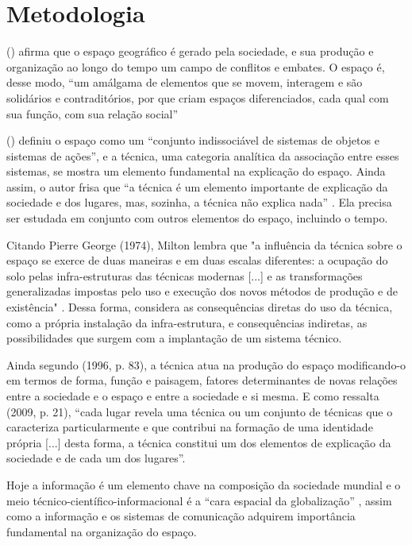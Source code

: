 \chapter{Metodologia}

 (\citeyear{isnard}) afirma que o espaço geográfico é gerado pela sociedade, e sua produção e organização ao longo do tempo um campo de conflitos e embates. O espaço é, desse modo, “um amálgama de elementos que se movem, interagem e são solidários e contraditórios, por que criam espaços diferenciados, cada qual com sua função, com sua relação social” \cite{mondardo}

 (\citeyear{santos1996}) definiu o espaço como um “conjunto indissociável de sistemas de objetos e sistemas de ações”, e a técnica, uma categoria analítica da associação entre esses sistemas, se mostra um elemento fundamental na explicação do espaço. Ainda assim, o autor frisa que “a técnica é um elemento importante de explicação da sociedade e dos lugares, mas, sozinha, a técnica não explica nada” \cite[p. 27]{santos1996}. Ela precisa ser estudada em conjunto com outros elementos do espaço, incluindo o tempo.

Citando Pierre George (1974), Milton lembra que "a influência da técnica sobre o espaço se exerce de duas maneiras e em duas escalas diferentes: a ocupação do solo pelas infra-estruturas das técnicas modernas [...] e as transformações generalizadas impostas pelo uso e execução dos novos métodos de produção e de existência" \cite[p. 19]{santos1996}. Dessa forma, considera as consequências diretas do uso da técnica, como a própria instalação da infra-estrutura, e consequências indiretas, as possibilidades que surgem com a implantação de um sistema técnico. 

Ainda segundo (1996, p. 83), a técnica atua na produção do espaço modificando-o em termos de forma, função e paisagem, fatores determinantes de novas relações entre a sociedade e o espaço e entre a sociedade e si mesma. E como ressalta  (2009, p. 21), “cada lugar revela uma técnica ou um conjunto de técnicas que o caracteriza particularmente e que contribui na formação de uma identidade própria [...] desta forma, a técnica constitui um dos elementos de explicação da sociedade e de cada um dos lugares”.

Hoje a informação é um elemento chave na composição da sociedade mundial e o meio técnico-científico-informacional é a “cara espacial da globalização” \cite{santos1996}, assim como a informação e os sistemas de comunicação adquirem importância fundamental na organização do espaço.


